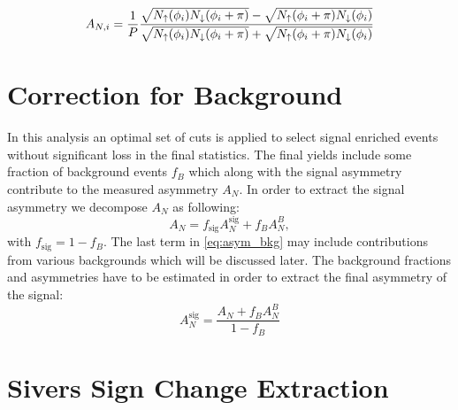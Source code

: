 \documentclass[12pt]{article}
\begin{document}
\begin{align}
A_{N, i} = \frac{1}{P} \frac{%
\sqrt{N_{\uparrow}(\phi_i)N_{\downarrow}(\phi_i+\pi)} -
\sqrt{N_{\uparrow}(\phi_i+\pi)N_{\downarrow}(\phi_i)}
}{%
\sqrt{N_{\uparrow}(\phi_i)N_{\downarrow}(\phi_i+\pi)} +
\sqrt{N_{\uparrow}(\phi_i+\pi)N_{\downarrow}(\phi_i)}
}
\label{eq:asym_sqrt}
\end{align}



\section{Correction for Background}

In this analysis an optimal set of cuts is applied to select signal enriched
events without significant loss in the final statistics. The final yields
include some fraction of background events $f_B$ which along with the signal
asymmetry contribute to the measured asymmetry $A_N$. In order to extract the
signal asymmetry we decompose $A_N$ as following:
%
\begin{equation}
A_N = f_\text{sig} A^\text{sig}_N + f_B A^B_N,
\label{eq:asym_bkg}
\end{equation}
%
with $f_\text{sig} = 1 - f_B$. The last term in \eqref{eq:asym_bkg} may include
contributions from various backgrounds which will be discussed later. The
background fractions and asymmetries have to be estimated in order to extract
the final asymmetry of the signal:
%
\begin{equation}
A^\text{sig}_N = \frac{A_N + f_B A^B_N}{1 - f_B}
\label{eq_bkg_corr}
\end{equation}



\section{Sivers Sign Change Extraction}
\end{document}
